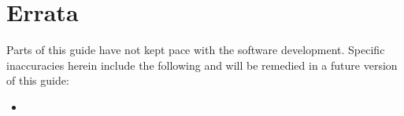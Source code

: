 \chapter*{Errata}

Parts of this guide have not kept pace with the software development.
Specific inaccuracies herein include the following and will be remedied in
a future version of this guide:
\begin{itemize}

  \item 

\end{itemize}

\thispagestyle{empty}

\newpage
